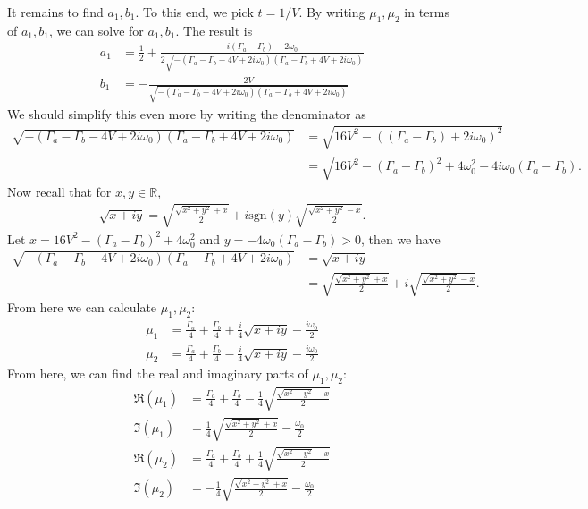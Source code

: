 \documentclass{article}
\theoremstyle{definition}
\newcommand{\f}[2]{\frac{#1}{#2}}
\begin{document}
\begin{enumerate}[label=(\alph*)]
	It remains to find $a_1,b_1$. To this end, we pick $t=1/V$. By writing $\mu_1,\mu_2$ in terms of $a_1,b_1$, we can solve for $a_1,b_1$. The result is 
	\begin{align*}
	a_1 &= \f{1}{2} + \frac{ i (\Gamma_a- \Gamma_b) - 2 \omega_0}{2 \sqrt{-(\Gamma_a-\Gamma_b-4
			V+2 i \omega_0) (\Gamma_a-\Gamma_b+4 V+2 i \omega_0)}}\\
	b_1 &= 	-\frac{2 V}{\sqrt{-(\Gamma_a-\Gamma_b-4 V+2 i \omega_0) (\Gamma_a-\Gamma_b+4 V+2 i\omega_0)}}
	\end{align*}
	We should simplify this even more by writing the denominator as 
	\begin{align*}
	\sqrt{-(\Gamma_a-\Gamma_b-4 V+2 i \omega_0) (\Gamma_a-\Gamma_b+4 V+2 i\omega_0)}
	&= \sqrt{16V^2 - ((\Gamma_a-\Gamma_b)+2 i\omega_0)^2}\\
	&= \sqrt{16V^2 - (\Gamma_a- \Gamma_b)^2 +4 \omega_0^2  - 4i\omega_0(\Gamma_a - \Gamma_b)}.
	\end{align*}
	Now recall that for $x,y\in \mathbb{R}$, 
	\begin{align*}
	\sqrt{x+iy} = \sqrt{\f{\sqrt{x^2+y^2} + x }{2}} + i\text{sgn}(y)\sqrt{\f{\sqrt{x^2+y^2} - x}{2}}.
	\end{align*}
	Let $x = 16V^2 - (\Gamma_a- \Gamma_b)^2 +4 \omega_0^2$ and $y = -4\omega_0(\Gamma_a - \Gamma_b) > 0$, then we have
	\begin{align*}
	\sqrt{-(\Gamma_a-\Gamma_b-4 V+2 i \omega_0) (\Gamma_a-\Gamma_b+4 V+2 i\omega_0)} &= \sqrt{x+iy} \\
	&=\sqrt{\f{\sqrt{x^2+y^2} + x }{2}} + i\sqrt{\f{\sqrt{x^2+y^2} - x}{2}}.
	\end{align*}
	From here we can calculate $\mu_1,\mu_2$:
	\begin{align*}
	\mu_1 &= \f{\Gamma_a}{4} + \f{\Gamma_b}{4} + \f{i}{4}\sqrt{x+iy} - \f{i\omega_0}{2} \\
	\mu_2 &= \f{\Gamma_a}{4} + \f{\Gamma_b}{4} - \f{i}{4}\sqrt{x+iy} - \f{i\omega_0}{2} 
	\end{align*}
	From here, we can find the real and imaginary parts of $\mu_1, \mu_2$:
	\begin{align*}
	\Re(\mu_1) 
	&= \f{\Gamma_a}{4} + \f{\Gamma_b}{4} - \f{1}{4}\sqrt{\f{\sqrt{x^2+y^2} - x}{2}}\\
	\Im(\mu_1) &= \f{1}{4} \sqrt{\f{\sqrt{x^2+y^2} + x }{2}}- \f{\omega_0}{2}\\
	\Re(\mu_2) &= \f{\Gamma_a}{4} + \f{\Gamma_b}{4}  + \f{1}{4}\sqrt{\f{\sqrt{x^2+y^2} - x}{2}}\\
	\Im(\mu_2) &=  -\f{1}{4} \sqrt{\f{\sqrt{x^2+y^2} + x }{2}}- \f{\omega_0}{2}
	\end{align*}
	

\end{enumerate}
\end{document}

